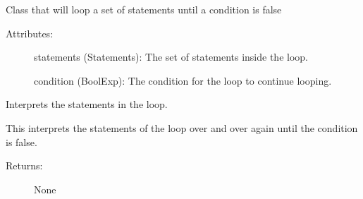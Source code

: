 \documentclass[letterpaper,10pt,english]{sphinxmanual}
\begin{document}
\begin{fulllineitems}
\label{\detokenize{statements:robol_lang.statements.Loop}}
\sphinxAtStartPar
Class that will loop a set of statements until a condition is false
\begin{description}
\item[{Attributes:}] \leavevmode
\sphinxAtStartPar
statements (Statements): The set of statements inside the loop.

\sphinxAtStartPar
condition (BoolExp): The condition for the loop to continue looping.

\end{description}

\begin{fulllineitems}
\label{\detokenize{statements:robol_lang.statements.Loop.interpret}}
\sphinxAtStartPar
Interprets the statements in the loop.

\sphinxAtStartPar
This interprets the statements of the loop over and over again until
the condition is false.
\begin{description}
\item[{Returns:}] \leavevmode
\sphinxAtStartPar
None

\end{description}

\end{fulllineitems}


\end{fulllineitems}

\end{document}
